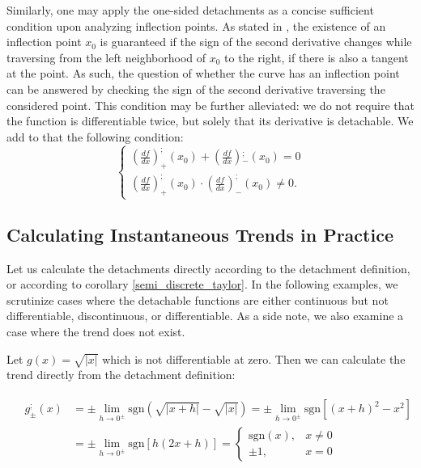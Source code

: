 \documentclass[11pt]{book}
\begin{document}
Similarly, one may apply the one-sided detachments as a concise
sufficient condition upon analyzing inflection points. As stated in
\cite{bronshtein2013handbook}, the existence of an inflection point $x_{0}$ is guaranteed if
the sign of the second derivative changes while traversing from the
left neighborhood of $x_{0}$ to the right, if there is also a tangent
at the point. As such, the question of whether the curve has an inflection
point can be answered by checking the sign of the second derivative
traversing the considered point. This condition may be further alleviated:
we do not require that the function is differentiable twice, but solely
that its derivative is detachable. We add to that the following condition:
\[
\begin{cases}
\left(\frac{df}{dx}\right)_{+}^{;}\left(x_{0}\right)+\left(\frac{df}{dx}\right){}_{-}^{;}\left(x_{0}\right)=0\\
\left(\frac{df}{dx}\right)_{+}^{;}\left(x_{0}\right)\cdot\left(\frac{df}{dx}\right)_{-}^{;}\left(x_{0}\right)\neq0.
\end{cases}
\]

\subsection{Calculating Instantaneous Trends in Practice}

Let us calculate the detachments directly according to the detachment definition, or according to corollary \ref{semi_discrete_taylor}. In the following examples, we scrutinize cases where the detachable functions are either continuous but not differentiable, discontinuous, or differentiable. As a side note, we also examine a case where the trend does not exist.

Let $g\left(x\right)=\sqrt{\left|x\right|}$ which is not differentiable at zero. Then we can calculate the trend directly from the detachment definition:

\begin{align}
&\begin{aligned}
g_{\pm}^{;}\left(x\right) & =\pm \underset{h\rightarrow0^{\pm}}{\lim}\text{sgn}\left(\sqrt{\left|x+h\right|}-\sqrt{\left|x\right|}\right)=\pm \underset{h\rightarrow0^{\pm}}{\lim}\text{sgn}\left[\left(x+h\right)^{2}-x^{2}\right]\\
& =\pm \underset{h\rightarrow0^{\pm}}{\lim}\text{sgn}\left[h\left(2x+h\right)\right]=\begin{cases}
\text{sgn}\left(x\right), & x\neq0\\
\pm 1, & x=0
\end{cases}
\end{aligned}
\end{align}
\end{document}
